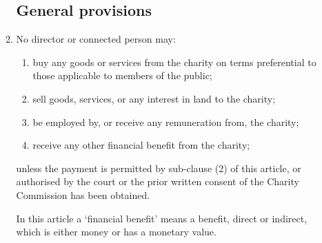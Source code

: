 \documentclass{article}
\begin{document}
\begin{enumerate}[label=\arabic*]
\begin{enumerate}[label=(\arabic*)]
        \subsection{General provisions}
        
        \item No director or connected person may:
        \begin{enumerate}[label=(\alph*)]
            \item buy any goods or services from the charity on terms
            preferential to those applicable to members of the public;
            \item sell goods, services, or any interest in land to the charity;
            \item be employed by, or receive any remuneration from,
            the charity;
            \item receive any other financial benefit from the charity;
        \end{enumerate}
        
        unless the payment is permitted by sub-clause (2) of this article,
        or authorised by the court or the prior written consent of the
        Charity Commission has been obtained.
        
        In this article a ‘financial benefit’ means a benefit, direct or indirect,
        which is either money or has a monetary value.
        

\end{enumerate}
\end{enumerate}
\end{document}
